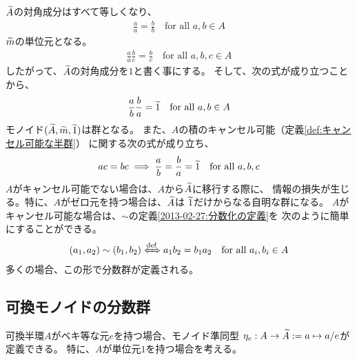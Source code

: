 	${\widetilde{A}}$の対角成分はすべて等しくなり、
	\begin{equation*}\begin{split}
		\frac{a}{a} = \frac{b}{b} \quad\text{for all } a,b\in A
	\end{split}\end{equation*}
	${\widetilde{m}}$の単位元となる。
	\begin{equation*}\begin{split}
		\frac{a}{a}\frac{b}{c} = \frac{b}{c} \quad\text{for all } a,b,c\in A
	\end{split}\end{equation*}
	したがって、${\widetilde{A}}$の対角成分を$1$と書く事にする。
	そして、次の式が成り立つことから、
	\begin{equation*}\begin{split}
		\frac{a}{b}\frac{b}{a} = {\widetilde{1}} \quad\text{for all } a,b\in A
	\end{split}\end{equation*}
	モノイド$({\widetilde{A}},{\widetilde{m}},{\widetilde{1}})$は群となる。
	また、$A$の積のキャンセル可能（定義\ref{def:キャンセル可能な半群}）
	に関する次の式が成り立ち、
	\begin{equation*}\begin{split}
		ac = bc \implies \frac{a}{b} = \frac{b}{a} = {\widetilde{1}}
		\quad\text{for all } a,b,c
	\end{split}\end{equation*}
	$A$がキャンセル可能でない場合は、$A$から${\widetilde{A}}$に移行する際に、
	情報の損失が生じる。特に、$A$がゼロ元を持つ場合は、${\widetilde{A}}$は
	${\widetilde{1}}$だけからなる自明な群になる。
	$A$がキャンセル可能な場合は、$\sim$の定義\eqref{2013-02-27:分数化の定義}を
	次のように簡単にすることができる。
	\begin{equation*}\begin{split}
		(a_1, a_2)\sim(b_1, b_2) \xiff{\dfn} a_1b_2 = b_1a_2
		\quad\text{for all } a_i,b_i\in A
	\end{split}\end{equation*}
	多くの場合、この形で分数群が定義される。

\subsection{可換モノイドの分数群}\label{s2:可換モノイドの分数群} %
	可換半環$A$がベキ等な元$e$を持つ場合、モノイド準同型
	$\eta_e:A\to{\widetilde{A}}:=a\mapsto a/e$が定義できる。
	特に、$A$が単位元$1$を持つ場合を考える。

